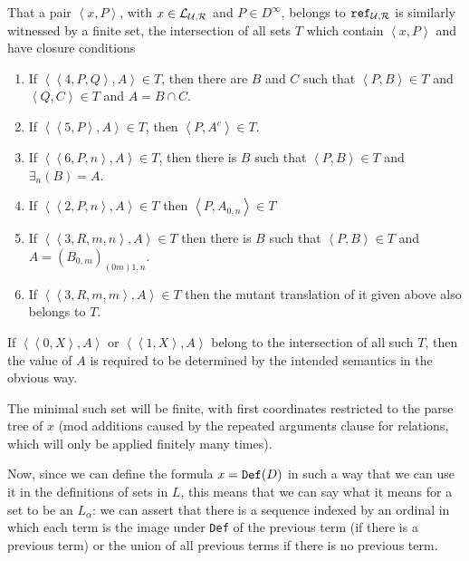 \documentclass[12pt]{book}
\begin{document}
That a pair $\left<x,P\right>$, with $x \in {\cal L}_{\cal U,R}$ and $P \in D^{\infty}$,  belongs to ${\tt ref}_{\cal U,R}$ is similarly witnessed by a finite set, the intersection of all sets $T$ which contain
$\left<x,P\right>$ and have closure conditions

\begin{enumerate}

\item  If $\left<\left<4,P,Q\right>,A\right> \in T$, then there are $B$ and $C$ such that $\left<P,B\right> \in T$ and
$\left<Q,C\right> \in T$ and $A = B \cap C$.

\item If $\left<\left<5,P\right>,A\right> \in T$, then $\left<P,A^c\right> \in T$.

\item If $\left<\left<6,P,n\right>,A\right> \in T$, then there is $B$ such that $\left<P,B\right> \in T$ and $\exists_n(B) = A$.

\item If $\left<\left<2,P,n\right>,A\right> \in T$ then $\left<P,A_{0,n}\right>\in T$

\item If $\left<\left<3,R,m,n\right>,A\right> \in T$ then there is $B$ such that $\left<P,B\right>\in T$ and $A = (B_{0,m})_{(0m)1,n}$.

\item If $\left<\left<3,R,m,m\right>,A\right> \in T$ then the mutant translation of it given above also belongs to $T$.

\end{enumerate}
 If $\left<\left<0,X\right>,A\right>$ or  $\left<\left<1,X\right>,A\right>$ belong to the intersection of all such $T$, then the value of $A$ is required to  be determined by the intended semantics in the obvious way.


The minimal such set will be finite, with first coordinates restricted to the parse tree of $x$ (mod additions caused by the repeated arguments clause for relations, which will only be applied finitely many times).

Now, since we can define the formula $x={\tt Def}(D)$ in such a way that we can use it in the definitions of sets in $L$, this means that we
can say what it means for a set to be an $L_{\alpha}$:  we can assert that there is a sequence indexed by an ordinal in which each term is the image under {\tt Def} of the previous term (if there is a previous term) or the union of all previous terms if there is no previous term.
\end{document}
